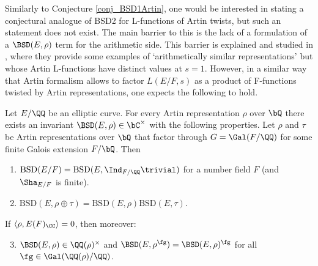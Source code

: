 Similarly to Conjecture \ref{conj_BSD1Artin}, one would be interested in stating a conjectural analogue of BSD2 for L-functions of Artin twists, but such an statement does not exist. The main barrier to this is the lack of a formulation of a $\BSD(E,\rho)$ term for the arithmetic side. This barrier is explained and studied in \cite[\S4]{DEW1}, where they provide some examples of `arithmetically similar representations' but whose Artin L-functions have distinct values at $s=1$. However, in a similar way that Artin formalism allows to factor $L(E/F,s)$ as a product of F-functions twisted by Artin representations, one expects the following to hold.

\begin{conj}{\cite[Conjecture 4]{DEW1}}\label{conj_conjecture4}
    Let $E/\QQ$ be an elliptic curve. 
    For every Artin representation $\rho$ over $\bQ$ there exists an invariant $\BSD(E, \rho) \in \bC^{\times}$ with the following properties. 
    Let $\rho$ and $\tau$ be Artin representations over $\bQ$ that factor through $G = \Gal(F/\QQ)$ for some finite Galois extension $F / \bQ$. Then 
    \begin{enumerate}[label={\bfseries C\arabic*.}]
        \setlength\itemsep{0em}
        \item $\mathrm{BSD}(E/F)=\mathrm{BSD}(E,\Ind_{F/\QQ}\trivial)$ for a number field $F$ (and $\Sha_{E/F}$ is finite).
        \item $\mathrm{BSD}(E,\rho\oplus\tau)=\mathrm{BSD}(E,\rho)\mathrm{BSD}(E,\tau)$.
    \end{enumerate}       
        If $\langle\rho,E(F)_\CC\rangle=0$, then moreover:
    \begin{enumerate}[label={\bfseries C\arabic*.}]
        \setcounter{enumi}{2}
       \item $\BSD(E,\rho)\in\QQ(\rho)^{\times}$ and $\BSD(E,\rho^{\fg})=\BSD(E,\rho)^{\fg}$ for all $\fg\in\Gal(\QQ(\rho)/\QQ)$.%
    \end{enumerate}
\end{conj}


